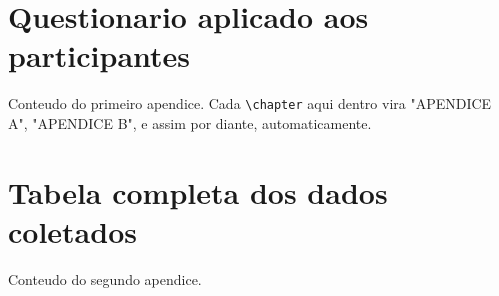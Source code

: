 %
%
%

\begin{apendicesenv}

  \partapendices

  \chapter{Questionario aplicado aos participantes}
  \label{ape:questionario}

  Conteudo do primeiro apendice. Cada \verb|\chapter| aqui dentro vira
  "APENDICE A", "APENDICE B", e assim por diante, automaticamente.

  \chapter{Tabela completa dos dados coletados}
  \label{ape:dados}

  Conteudo do segundo apendice.

\end{apendicesenv}
